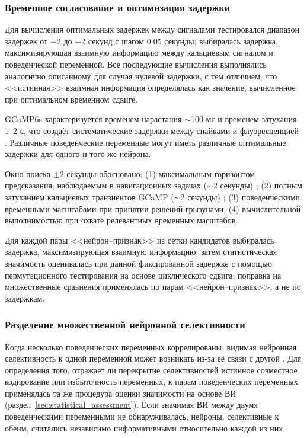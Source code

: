 \subsubsection{Временное согласование и оптимизация задержки}
\label{sec:temporal_alignment}

Для вычисления оптимальных задержек между сигналами тестировался диапазон задержек от $-2$ до $+2$ секунд с шагом 0.05 секунды; выбиралась задержка, максимизирующая
взаимную информацию между кальциевым сигналом и поведенческой переменной. Все
последующие вычисления выполнялись аналогично описанному для случая нулевой задержки,
с тем отличием, что <<истинная>> взаимная информация определялась как значение, вычисленное при оптимальном временном сдвиге.

GCaMP6s характеризуется временем нарастания $\sim$100 мс и временем затухания 1--2 с, что создаёт систематические задержки между спайками и флуоресценцией \citep{Zhang2023}. Различные поведенческие переменные
могут иметь различные оптимальные задержки для одного и того же нейрона.

Окно поиска $\pm 2$ секунды обосновано: (1) максимальным горизонтом предсказания,
наблюдаемым в навигационных задачах ($\sim$2 секунды) \citep{Lian2022}; (2) полным затуханием
кальциевых транзиентов GCaMP ($\sim$2 секунды) \citep{Zhang2023}; (3) поведенческими временными масштабами
при принятии решений грызунами; (4) вычислительной выполнимостью при охвате релевантных
временных масштабов.

Для каждой пары <<нейрон--признак>> из сетки кандидатов выбиралась задержка, максимизирующая взаимную информацию;
затем статистическая значимость оценивалась при данной фиксированной
задержке с помощью пермутационного тестирования на основе циклического сдвига; поправка на множественные сравнения
применялась по парам <<нейрон--признак>>, а не по задержкам.


\subsubsection{Разделение множественной нейронной селективности}
\label{sec:disentangling_selectivity}


Когда несколько поведенческих переменных коррелированы, видимая нейронная селективность
к одной переменной может возникать из-за её связи с другой \citep{mix,mix3}.
Для определения того, отражает ли перекрытие селективностей истинное совместное кодирование или
избыточность переменных, к парам поведенческих переменных применялась та же процедура оценки значимости на основе ВИ
(раздел~\ref{sec:statistical_assessment}). Если значимая ВИ между двумя поведенческими
переменными не обнаруживалась, нейроны, селективные к обеим, считались независимо информативными относительно каждой из них.

